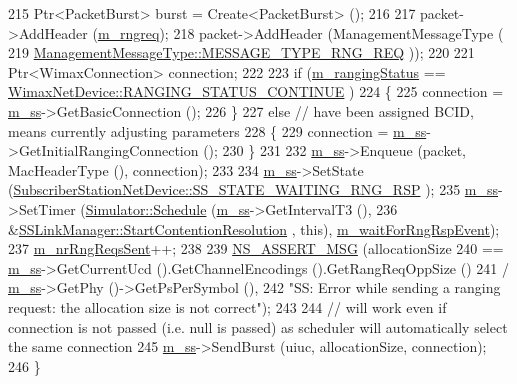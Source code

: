 \begin{DoxyCode}
215   Ptr<PacketBurst> burst = Create<PacketBurst> ();
216 
217   packet->AddHeader (\hyperlink{classns3_1_1SSLinkManager_a3529ea909c47514bd720211fb5bb3702}{m\_rngreq});
218   packet->AddHeader (ManagementMessageType (
219                        \hyperlink{classns3_1_1ManagementMessageType_a0e0c7a1e263538f0379d1bdb015abe3dacef47c5246aa3c32cee3ac10411734fe}{ManagementMessageType::MESSAGE\_TYPE\_RNG\_REQ}
      ));
220 
221   Ptr<WimaxConnection> connection;
222 
223   \textcolor{keywordflow}{if} (\hyperlink{classns3_1_1SSLinkManager_ae21f07956edc47367365d56c7913eee7}{m\_rangingStatus} == \hyperlink{classns3_1_1WimaxNetDevice_a2a74c0f01e51abc1851a630242e7b591ace0a03105b6d7cf2c6ec79e9789dc3a6}{WimaxNetDevice::RANGING\_STATUS\_CONTINUE}
      )
224     \{
225       connection = \hyperlink{classns3_1_1SSLinkManager_a44506c63befdc33eb0e0b4ba7f93d498}{m\_ss}->GetBasicConnection ();
226     \}
227   \textcolor{keywordflow}{else}     \textcolor{comment}{// have been assigned BCID, means currently adjusting parameters}
228     \{
229       connection = \hyperlink{classns3_1_1SSLinkManager_a44506c63befdc33eb0e0b4ba7f93d498}{m\_ss}->GetInitialRangingConnection ();
230     \}
231 
232   \hyperlink{classns3_1_1SSLinkManager_a44506c63befdc33eb0e0b4ba7f93d498}{m\_ss}->Enqueue (packet, MacHeaderType (), connection);
233 
234   \hyperlink{classns3_1_1SSLinkManager_a44506c63befdc33eb0e0b4ba7f93d498}{m\_ss}->SetState (\hyperlink{classns3_1_1SubscriberStationNetDevice_af9f145bc05df1f18610a3d4b61ff9ee4acb68c803df0eb6a0f4cc41389f981db8}{SubscriberStationNetDevice::SS\_STATE\_WAITING\_RNG\_RSP}
      );
235   \hyperlink{classns3_1_1SSLinkManager_a44506c63befdc33eb0e0b4ba7f93d498}{m\_ss}->SetTimer (\hyperlink{classns3_1_1Simulator_a671882c894a08af4a5e91181bf1eec13}{Simulator::Schedule} (\hyperlink{classns3_1_1SSLinkManager_a44506c63befdc33eb0e0b4ba7f93d498}{m\_ss}->GetIntervalT3 (),
236                                        &\hyperlink{classns3_1_1SSLinkManager_a66aa8588d143de2568b1eebc46df4ad6}{SSLinkManager::StartContentionResolution}
      , \textcolor{keyword}{this}), \hyperlink{classns3_1_1SSLinkManager_a6e94b74ad20fe217bf121b94deeca1ba}{m\_waitForRngRspEvent});
237   \hyperlink{classns3_1_1SSLinkManager_a28fe764252091022ad2f4fc1ae8a0cbc}{m\_nrRngReqsSent}++;
238 
239   \hyperlink{assert_8h_aff5ece9066c74e681e74999856f08539}{NS\_ASSERT\_MSG} (allocationSize
240                  == \hyperlink{classns3_1_1SSLinkManager_a44506c63befdc33eb0e0b4ba7f93d498}{m\_ss}->GetCurrentUcd ().GetChannelEncodings ().GetRangReqOppSize ()
241                  / \hyperlink{classns3_1_1SSLinkManager_a44506c63befdc33eb0e0b4ba7f93d498}{m\_ss}->GetPhy ()->GetPsPerSymbol (),
242                  \textcolor{stringliteral}{"SS: Error while sending a ranging request: the allocation size is not correct"});
243 
244   \textcolor{comment}{// will work even if connection is not passed (i.e. null is passed) as scheduler will automatically
       select the same connection}
245   \hyperlink{classns3_1_1SSLinkManager_a44506c63befdc33eb0e0b4ba7f93d498}{m\_ss}->SendBurst (uiuc, allocationSize, connection);
246 \}
\end{DoxyCode}


